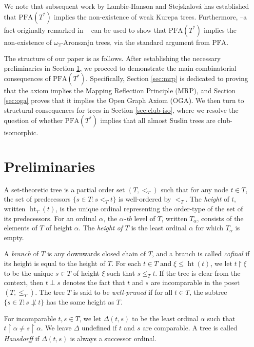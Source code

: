 \documentclass{amsart}
\theoremstyle{definition}
\newcommand{\res}{\restriction}
\newcommand{\PFA}{\mathrm{PFA}}
\newcommand{\MRP}{\mathrm{MRP}}
\newcommand{\OGA}{\mathrm{OGA}}
\DeclareMathOperator{\hht}{ht}
\begin{document}
We note that subsequent work by Lambie-Hanson and Stejskalová \cite{Lambie2025} has established that $\PFA(T^{*})$ implies the non-existence of weak Kurepa trees. Furthermore, \cite[Fact 6.19(4)]{Lambie2025} --a fact originally remarked in \cite{Krueger2020}-- can be used to show that $\PFA(T^{*})$ implies the non-existence of $\omega_2$-Aronszajn trees, via the standard argument from $\PFA$.

The structure of our paper is as follows.
After establishing the necessary preliminaries in Section \ref{sec:prelim}, we proceed to demonstrate the main combinatorial consequences of $\PFA(T^*)$. Specifically, Section \ref{sec:mrp} is dedicated to proving that the axiom implies the Mapping Reflection Principle ($\MRP$), and Section \ref{sec:oga} proves that it implies the Open Graph Axiom ($\OGA$). We then turn to structural consequences for trees in Section \ref{sec:club-iso}, where we resolve the question of whether $\PFA(T^*)$ implies that all almost Suslin trees are club-isomorphic.

\section{Preliminaries}\label{sec:prelim}
A  set-theoretic tree is a partial order set $(T,<_{T})$  such that
for any node $t \in T$, the set of predecessors  $\{s \in T : s <_{T} t\}$   is   well-ordered by $<_T$. The \emph{height} of $t$, written $\hht_{T}(t)$, is the unique ordinal representing the  order-type of the set of its predecessors.  For an ordinal $\alpha$, the
\emph{$\alpha$-th} level of $T$, written $T_{\alpha}$, consists
of the elements of $T$ of height $\alpha$. The \emph{height of $T$}
is the least ordinal $\alpha$ for which $T_{\alpha}$ is empty.


A \emph{branch} of $T$ is any downwards closed
chain of $T$, and a branch is called \emph{cofinal} if its height is equal to the height
of $T$. For each $t \in T$ and $\xi \le \hht(t)$, we let
$t\res \xi$ to be the unique $s \in T$ of height $\xi$ such that
$s \le_{T} t$. If the tree is clear from the context, then $t \perp s$ denotes the fact  that $t$ and $s$ are incomparable in the poset $(T,\le_{T})$. The tree $T$ is said to be \emph{well-pruned} if
for all $t \in T$, the subtree $\{s \in T : s \not\perp t\}$ has the same height
as $T$.

For incomparable $t,s \in T$, we let
$\Delta(t,s)$ to be the least ordinal  $\alpha$ such that
$t \res \alpha \neq s \res \alpha$. We leave $\Delta$ undefined
if $t$ and $s$ are comparable. A tree is called
\emph{Hausdorff} if $\Delta(t,s)$ is always a successor ordinal.
\end{document}
